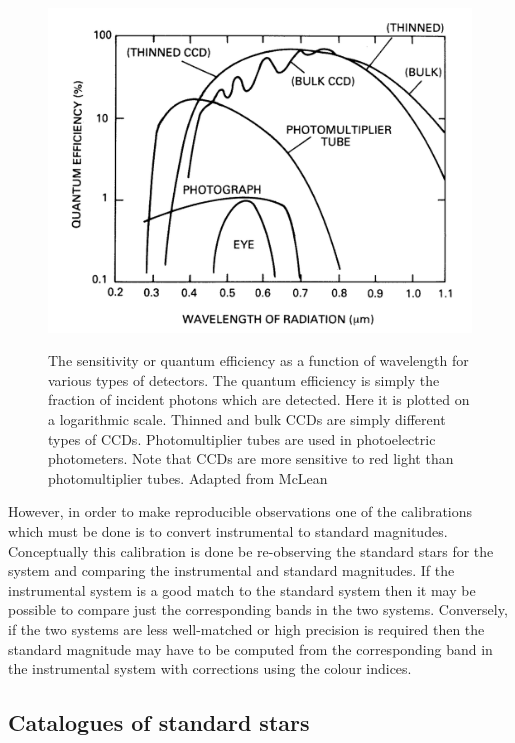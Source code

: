\documentclass[twoside,11pt,nolof]{starlink}
\begin{document}
\begin{figure}[htbp]
   \centering
   \includegraphics[totalheight=3in]{sc6_sensitivity}
   \begin{quote}
   \caption[The wavelength sensitivity of various types of detectors]
    {The sensitivity or quantum efficiency as a function of wavelength for
    various types of detectors.  The quantum efficiency is simply the
    fraction of incident photons which are detected.  Here it is plotted
    on a logarithmic scale.  Thinned and bulk CCDs are simply different
    types of CCDs.  Photomultiplier tubes are used in photoelectric
    photometers.  Note that CCDs are more sensitive to red light than
    photomultiplier tubes.  Adapted from McLean\cite{MCLEAN97}
   \label{SENSITIVITY} }
   \end{quote}
\end{figure}

However, in order to make reproducible observations one of the
calibrations which must be done is to convert instrumental to standard
magnitudes.  Conceptually this calibration is done be re-observing
the standard stars for the system and comparing the instrumental and
standard magnitudes.  If the instrumental system is a good match to the
standard system then it may be possible to compare just the
corresponding bands in the two systems.  Conversely, if the two systems
are less well-matched or high precision is required then the standard
magnitude may have to be computed from the corresponding band in the
instrumental system with corrections using the colour indices.

\subsection{\label{CATS}Catalogues of standard stars}
\end{document}
